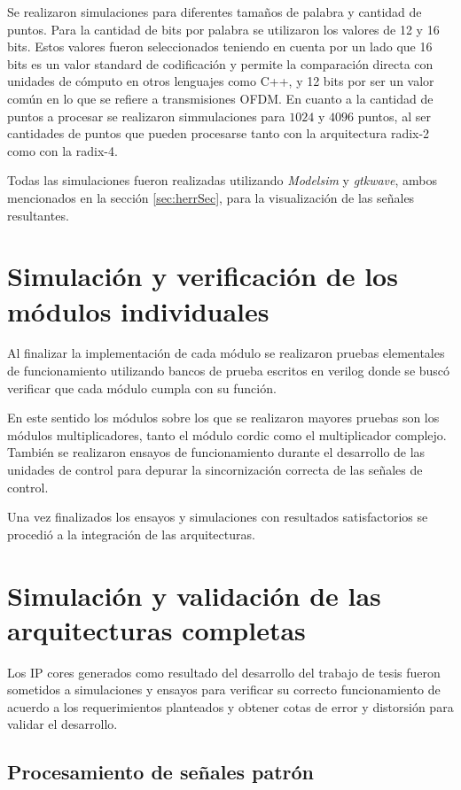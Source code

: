 Se realizaron simulaciones para diferentes tamaños de palabra y cantidad de puntos. Para la cantidad
de bits por palabra se utilizaron los valores de 12 y 16 bits. Estos valores fueron seleccionados
teniendo en cuenta por un lado que 16 bits es un valor standard de codificación y permite la comparación
directa con unidades de cómputo en otros lenguajes como C++, y 12 bits por ser un valor común en lo
que se refiere a transmisiones OFDM. En cuanto a la cantidad de puntos a procesar se realizaron
simmulaciones para $1024$ y $4096$ puntos, al ser cantidades de puntos que pueden procesarse tanto
con la arquitectura radix-2 como con la radix-4.

Todas las simulaciones fueron realizadas utilizando \textit{Modelsim} y \textit{gtkwave}, ambos
mencionados en la sección \ref{sec:herrSec}, para la visualización de las señales resultantes.

\section{Simulación y verificación de los módulos individuales}

Al finalizar la implementación de cada módulo se realizaron pruebas elementales de funcionamiento
utilizando bancos de prueba escritos en verilog donde se buscó verificar que cada módulo cumpla con su
función.

En este sentido los módulos sobre los que se realizaron mayores pruebas son los módulos
multiplicadores, tanto el módulo cordic como el multiplicador complejo.
También se realizaron ensayos de funcionamiento durante el desarrollo de las unidades de control
para depurar la sincornización correcta de las señales de control.

Una vez finalizados los
ensayos y simulaciones con resultados satisfactorios se procedió a la integración de las
arquitecturas.

\section{Simulación y validación de las arquitecturas completas}

Los IP cores generados como resultado del desarrollo del trabajo de tesis fueron sometidos a
simulaciones y ensayos para verificar su correcto funcionamiento de acuerdo a los requerimientos
planteados y obtener cotas de error y distorsión para validar el desarrollo.

\subsection{Procesamiento de señales patrón} \label{sec:enspatron}

